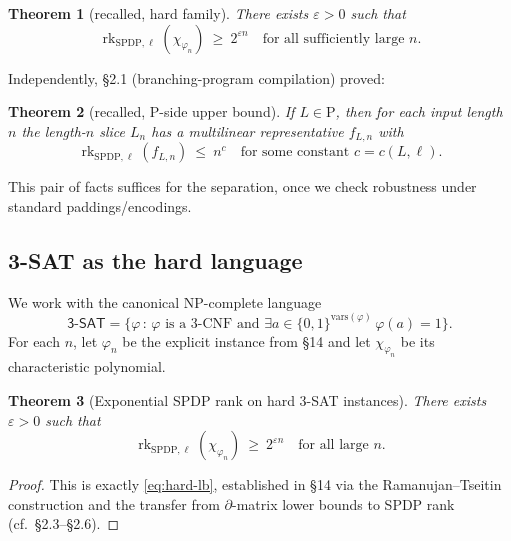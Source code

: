 \documentclass[12pt]{article}
\newtheorem{theorem}{Theorem}
\theoremstyle{definition}
\theoremstyle{definition}
\theoremstyle{remark}
\theoremstyle{remark}
\begin{document}
\begin{theorem}[recalled, hard family]\label{thm:hard-family-recalled}
There exists $\varepsilon>0$ such that
\begin{equation}\label{eq:hard-lb}
\operatorname{rk}_{\mathrm{SPDP},\ell}(\chi_{\varphi_n})\ \ge\ 2^{\varepsilon n}\quad\text{for all sufficiently large~$n$.}
\end{equation}
\end{theorem}

Independently, \S2.1 (branching-program compilation) proved:

\begin{theorem}[recalled, P-side upper bound]\label{thm:p-upper-recalled}
If $L\in\mathrm{P}$, then for each input length $n$ the length-$n$ slice $L_n$ has a multilinear representative $f_{L,n}$ with
\begin{equation}\label{eq:p-upper}
\operatorname{rk}_{\mathrm{SPDP},\ell}(f_{L,n})\ \le\ n^c\quad\text{for some constant~$c=c(L,\ell)$.}
\end{equation}
\end{theorem}

This pair of facts suffices for the separation, once we check robustness under standard paddings/encodings.

\subsection{3-SAT as the hard language}

We work with the canonical NP-complete language
\[
\mathsf{3}\text{-}\mathsf{SAT}=\bigl\{\varphi\,:\,\varphi\text{ is a 3-CNF and }\exists a\in\{0,1\}^{\mathrm{vars}(\varphi)}\,\varphi(a)=1\bigr\}.
\]
For each $n$, let $\varphi_n$ be the explicit instance from \S14 and let $\chi_{\varphi_n}$ be its characteristic polynomial.

\begin{theorem}[Exponential SPDP rank on hard 3-SAT instances]\label{thm:3sat-hard-rank}
There exists $\varepsilon>0$ such that
\[
\operatorname{rk}_{\mathrm{SPDP},\ell}(\chi_{\varphi_n})\ \ge\ 2^{\varepsilon n}\quad\text{for all large~$n$.}
\]
\end{theorem}

\begin{proof}
This is exactly \eqref{eq:hard-lb}, established in \S14 via the Ramanujan--Tseitin construction and the transfer from $\partial$-matrix lower bounds to SPDP rank (cf.\ \S2.3--\S2.6).
\end{proof}
\end{document}
